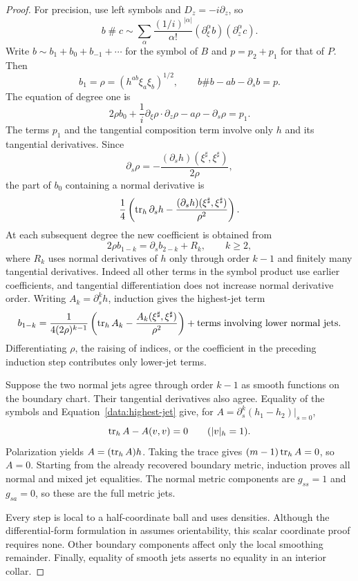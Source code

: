 \begin{proof}
For precision, use left symbols and $D_z=-i\partial_z$, so
\[
 b\mathbin{\#}c\sim
 \sum_\alpha\frac{(1/i)^{|\alpha|}}{\alpha!}
       (\partial_\xi^\alpha b)(\partial_z^\alpha c).
\]
Write $b\sim b_1+b_0+b_{-1}+\cdots$ for the symbol of $B$ and
$p=p_2+p_1$ for that of $P$. Then
\[
 b_1=\rho=(h^{ab}\xi_a\xi_b)^{1/2},\qquad
 b\#b-ab-\partial_sb=p.
\]
The equation of degree one is
\[
 2\rho b_0+\frac1i\partial_\xi\rho\cdot\partial_z\rho
             -a\rho-\partial_s\rho=p_1.
\]
The terms $p_1$ and the tangential composition term involve only $h$
and its tangential derivatives. Since
\[
 \partial_s\rho
 =-\frac{(\partial_s h)(\xi^\sharp,\xi^\sharp)}{2\rho},
\]
the part of $b_0$ containing a normal derivative is
\[
 \frac14\left(\operatorname{tr}_h\partial_s h
       -\frac{(\partial_s h)(\xi^\sharp,\xi^\sharp)}{\rho^2}\right).
\]
At each subsequent degree the new coefficient is obtained from
\[
 2\rho b_{1-k}=\partial_s b_{2-k}+R_k,\qquad k\ge2,
\]
where $R_k$ uses normal derivatives of $h$ only through order $k-1$
and finitely many tangential derivatives. Indeed all other terms in
the symbol product use earlier coefficients, and tangential
differentiation does not increase normal derivative order.
Writing $A_k=\partial_s^k h$, induction gives the highest-jet term
\begin{equation}\label{data:highest-jet}
 b_{1-k}=
 \frac{1}{4(2\rho)^{k-1}}
 \left(\operatorname{tr}_h A_k-
        \frac{A_k(\xi^\sharp,\xi^\sharp)}{\rho^2}\right)
 +\text{terms involving lower normal jets}.
\end{equation}
Differentiating $\rho$, the raising of indices, or the coefficient
in the preceding induction step contributes only lower-jet terms.

Suppose the two normal jets agree through order $k-1$ as smooth
functions on the boundary chart. Their tangential derivatives also
agree. Equality of the symbols and Equation~\eqref{data:highest-jet}
give, for $A=\partial_s^k(h_1-h_2)|_{s=0}$,
\[
 \operatorname{tr}_h A-A(v,v)=0\qquad(|v|_h=1).
\]
Polarization yields $A=(\operatorname{tr}_h A)h$. Taking the trace gives
$(m-1)\operatorname{tr}_h A=0$, so $A=0$. Starting from the already recovered
boundary metric, induction proves all normal and mixed jet
equalities. The normal metric components are $g_{ss}=1$ and
$g_{sa}=0$, so these are the full metric jets.

Every step is local to a half-coordinate ball and uses densities.
Although the differential-form formulation in
\citep{JoshiLionheart2005} assumes orientability, this scalar
coordinate proof requires none. Other boundary components affect
only the local smoothing remainder. Finally, equality of smooth
jets asserts no equality in an interior collar.
\end{proof}

